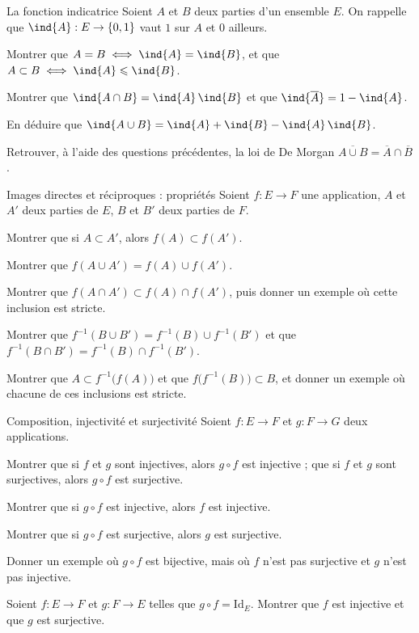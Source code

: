 \begin{exercice}[2]{La fonction indicatrice}
Soient $A$ et $B$ deux parties d'un ensemble $E$. On rappelle que
$\ind{A}:E\to\ens{0,1}$ vaut $1$ sur $A$ et $0$ ailleurs.
\begin{questions}
  \item Montrer que $A=B\iff\ind{A}=\ind{B}$, et que
    $A\subset B\iff\ind{A}\leq\ind{B}$.
  \item Montrer que $\ind{A\cap B}=\ind{A}\,\ind{B}$ et que
    $\ind{\overline{A}}=1-\ind{A}$.
  \item En déduire que $\ind{A\cup B}=\ind{A}+\ind{B}-\ind{A}\,\ind{B}$.
  \item Retrouver, à l'aide des questions précédentes, la loi de De Morgan
    $\overline{A\cup B}=\overline{A}\cap\overline{B}$.
\end{questions}
\end{exercice}

\begin{exercice}[2]{Images directes et réciproques : propriétés}
Soient $f:E\to F$ une application, $A$ et $A'$ deux parties de $E$, $B$ et
$B'$ deux parties de $F$.
\begin{questions}
  \item Montrer que si $A\subset A'$, alors $f(A)\subset f(A')$.
  \item Montrer que $f(A\cup A')=f(A)\cup f(A')$.
  \item Montrer que $f(A\cap A')\subset f(A)\cap f(A')$, puis donner un
    exemple où cette inclusion est stricte.
  \item Montrer que $f^{-1}(B\cup B')=f^{-1}(B)\cup f^{-1}(B')$ et que
    $f^{-1}(B\cap B')=f^{-1}(B)\cap f^{-1}(B')$.
  \item Montrer que $A\subset f^{-1}\bigl(f(A)\bigr)$ et que
    $f\bigl(f^{-1}(B)\bigr)\subset B$, et donner un exemple où chacune de ces
    inclusions est stricte.
\end{questions}
\end{exercice}


\begin{exercice}[3]{Composition, injectivité et surjectivité}
Soient $f:E\to F$ et $g:F\to G$ deux applications.
\begin{questions}
  \item Montrer que si $f$ et $g$ sont injectives, alors $g\circ f$ est
    injective ; que si $f$ et $g$ sont surjectives, alors $g\circ f$ est
    surjective.
  \item Montrer que si $g\circ f$ est injective, alors $f$ est injective.
  \item Montrer que si $g\circ f$ est surjective, alors $g$ est surjective.
  \item Donner un exemple où $g\circ f$ est bijective, mais où $f$ n'est pas
    surjective et $g$ n'est pas injective.
  \item Soient $f:E\to F$ et $g:F\to E$ telles que $g\circ f=\mathrm{Id}_E$.
    Montrer que $f$ est injective et que $g$ est surjective.
\end{questions}
\end{exercice}

